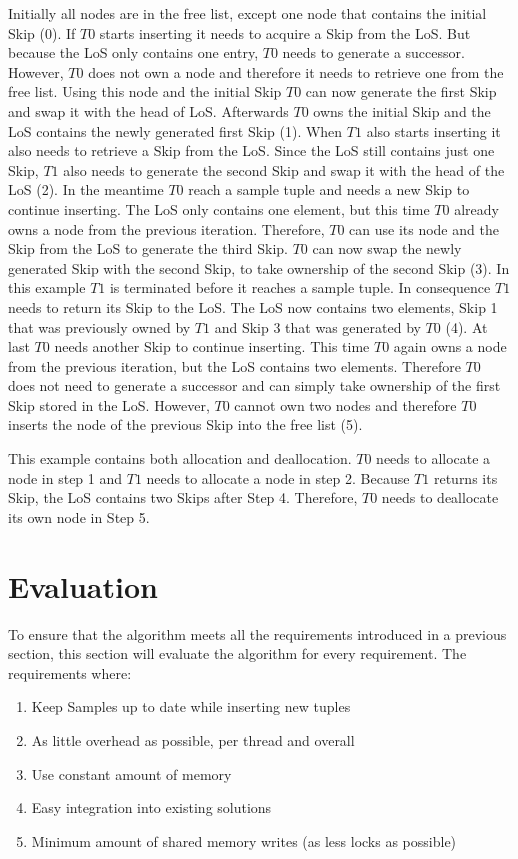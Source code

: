 \documentclass[sigconf,nonacm]{acmart}
\begin{document}
        Initially all nodes are in the free list, except one node that contains the initial Skip (0). If $T0$ starts inserting it needs to acquire a Skip from the LoS. But because the LoS only contains one entry, $T0$ needs to generate a successor. However, $T0$ does not own a node and therefore it needs to retrieve one from the free list. Using this node and the initial Skip $T0$ can now generate the first Skip and swap it with the head of LoS. Afterwards $T0$ owns the initial Skip and the LoS contains the newly generated first Skip (1). When $T1$ also starts inserting it also needs to retrieve a Skip from the LoS. Since the LoS still contains just one Skip, $T1$ also needs to generate the second Skip and swap it with the head of the LoS (2). In the meantime $T0$ reach a sample tuple and needs a new Skip to continue inserting. The LoS only contains one element, but this time $T0$ already owns a node from the previous iteration. Therefore, $T0$ can use its node and the Skip from the LoS to generate the third Skip. $T0$ can now swap the newly generated Skip with the second Skip, to take ownership of the second Skip (3). In this example $T1$ is terminated before it reaches a sample tuple. In consequence $T1$ needs to return its Skip to the LoS. The LoS now contains two elements, Skip 1 that was previously owned by $T1$ and Skip 3 that was generated by $T0$ (4). At last $T0$ needs another Skip to continue inserting. This time $T0$ again owns a node from the previous iteration, but the LoS contains two elements. Therefore $T0$ does not need to generate a successor and can simply take ownership of the first Skip stored in the LoS. However, $T0$ cannot own two nodes and therefore $T0$ inserts the node of the previous Skip into the free list (5).

        This example contains both allocation and deallocation. $T0$ needs to allocate a node in step 1 and $T1$ needs to allocate a node in step 2. Because $T1$ returns its Skip, the LoS contains two Skips after Step 4. Therefore, $T0$ needs to deallocate its own node in Step 5.


    \section{Evaluation}
        To ensure that the algorithm meets all the requirements introduced in a previous section, this section will evaluate the algorithm for every requirement. The requirements where:
        \begin{enumerate}
            \item Keep Samples up to date while inserting new tuples
            \item As little overhead as possible, per thread and overall
            \item Use constant amount of memory
            \item Easy integration into existing solutions
            \item Minimum amount of shared memory writes (as less locks as possible)
        \end{enumerate}
\end{document}
